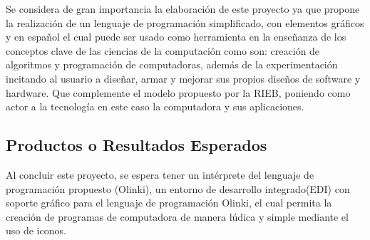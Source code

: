 \documentclass[letterpaper,10pt]{article}
\begin{document}
Se considera de gran importancia la elaboración de este proyecto ya que propone la realización
de un lenguaje de programación simplificado, con elementos gráficos y en español el cual
puede ser usado como herramienta en la enseñanza de los conceptos clave de las ciencias de la 
computación como son: creación de algoritmos y programación de computadoras, además de la 
experimentación incitando al usuario a diseñar, armar y mejorar sus propios diseños de software
y hardware. Que complemente el modelo propuesto por la RIEB, poniendo como actor a la tecnología
en este caso la computadora y sus aplicaciones.





\subsection{Productos o Resultados Esperados}
Al concluir este proyecto, se espera tener un intérprete del lenguaje de programación
propuesto (Olinki), un entorno de desarrollo integrado(EDI)
con soporte gráfico para el lenguaje de programación Olinki, el cual permita la creación
de programas de computadora de manera lúdica y simple mediante el uso de iconos.
\end{document}
